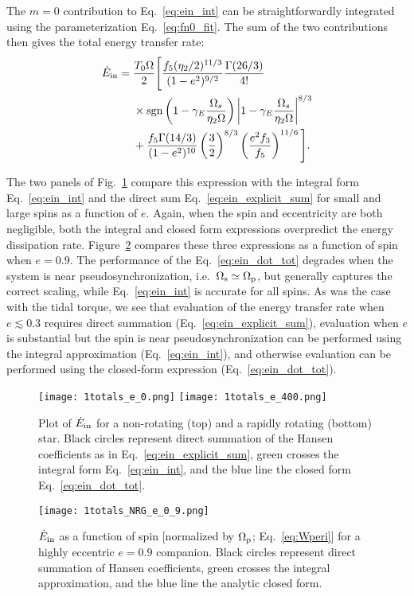 \documentclass[
        fleqn,
        usenatbib,
    ]{mnras}
\newcommand*{\p}[1]{\left(#1\right)}
\begin{document}
The $m = 0$ contribution to Eq.~\eqref{eq:ein_int} can be straightforwardly
integrated using the parameterization Eq.~\eqref{eq:fn0_fit}. The sum of the two
contributions then gives the total energy transfer rate:
\begin{align}
    \dot{E}_{\rm in} ={}& \frac{T_0 \Omega}{2}\Bigg[\frac{f_5
        (\eta_2/2)^{11/3}}{(1-e^2)^{9/2}} \frac{\Gamma(26/3)}{4!}\nonumber\\
        &\times \mathrm{sgn}\p{1 - \gamma_E\frac{\Omega_s}{\eta_2 \Omega}}
            \left|1 - \gamma_E\frac{\Omega_s}{\eta_2 \Omega}\right|^{8/3}
            \nonumber\\
        &+
    \frac{f_5 \Gamma(14 / 3)}{(1 - e^2)^{10}} \left(\frac{3}{2}\right)^{8/3}
            \left(\frac{e^2 f_3}{f_5}\right)^{11/6}\Bigg].
            \label{eq:ein_dot_tot}
\end{align}

The two panels of Fig.~\ref{fig:e0} compare this expression with the integral
form Eq.~\eqref{eq:ein_int} and the direct sum Eq.~\eqref{eq:ein_explicit_sum}
for small and large spins as a function of $e$. Again, when the spin and
eccentricity are both negligible, both the integral and closed form expressions
overpredict the energy dissipation rate. Figure~\ref{fig:e_spin} compares these
three expressions as a function of spin when $e = 0.9$. The performance of the
Eq.~\eqref{eq:ein_dot_tot} degrades when the system is near
pseudosynchronization, i.e.\ $\Omega_{\rm s} \simeq \Omega_{\rm p}$, but
generally captures the correct scaling, while Eq.~\eqref{eq:ein_int} is accurate
for all spins. As was the case with the tidal torque, we see that evaluation of
the energy transfer rate when $e \lesssim 0.3$ requires direct summation
(Eq.~\ref{eq:ein_explicit_sum}), evaluation when $e$ is substantial but the spin
is near pseudosynchronization can be performed using the integral approximation
(Eq.~\ref{eq:ein_int}), and otherwise evaluation can be performed using the
closed-form expression (Eq.~\ref{eq:ein_dot_tot}).
\begin{figure}
    \centering
    \texttt{[image: 1totals\_e\_0.png]}
    \texttt{[image: 1totals\_e\_400.png]}
    \caption{Plot of $\dot{E}_{\rm in}$ for a non-rotating (top) and a rapidly
    rotating (bottom) star. Black circles represent direct summation of the
    Hansen coefficients as in Eq.~\eqref{eq:ein_explicit_sum}, green crosses
    the integral form Eq.~\eqref{eq:ein_int}, and the blue line the closed form
    Eq.~\eqref{eq:ein_dot_tot}. }\label{fig:e0}
\end{figure}
\begin{figure}
    \centering
    \texttt{[image: 1totals\_NRG\_e\_0\_9.png]}
    \caption{$\dot{E}_{\rm in}$ as a function of spin [normalized by
    $\Omega_{\rm p}$; Eq.~\eqref{eq:Wperi}] for a highly eccentric $e = 0.9$
    companion. Black circles represent direct summation of Hansen coefficients,
    green crosses the integral approximation, and the blue line the analytic
    closed form. }\label{fig:e_spin}
\end{figure}
\end{document}
